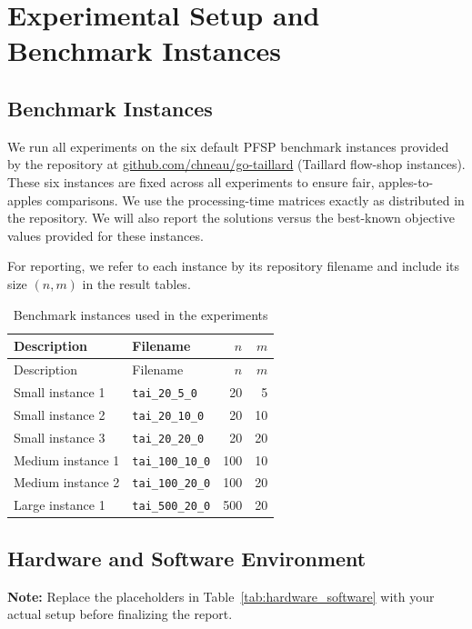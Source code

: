 \documentclass[12pt,a4paper]{report}
\begin{document}
\chapter{Experimental Setup and Benchmark Instances}
\section{Benchmark Instances}
We run all experiments on the six default PFSP benchmark instances provided by the repository at
\href{https://github.com/chneau/go-taillard}{github.com/chneau/go-taillard} (Taillard flow-shop instances).
These six instances are fixed across all experiments to ensure fair, apples-to-apples comparisons.
We use the processing-time matrices exactly as distributed in the repository. We will also report the solutions versus the best-known objective values provided for these instances.

For reporting, we refer to each instance by its repository filename and include its size $(n,m)$ in the result tables.\\

\begin{longtable}{llrr}
\caption{Benchmark instances used in the experiments}\label{tab:bench_instances}\\
\toprule
Description & Filename & $n$ & $m$ \\
\midrule
\endfirsthead
\toprule
Description & Filename & $n$ & $m$ \\
\midrule
\endhead
Small instance 1 & \texttt{tai\_20\_5\_0} & 20 & 5 \\
Small instance 2 & \texttt{tai\_20\_10\_0} & 20 & 10 \\
Small instance 3 & \texttt{tai\_20\_20\_0} & 20 & 20 \\
Medium instance 1 & \texttt{tai\_100\_10\_0} & 100 & 10 \\
Medium instance 2 & \texttt{tai\_100\_20\_0} & 100 & 20 \\
Large instance 1 & \texttt{tai\_500\_20\_0} & 500 & 20 \\
\bottomrule
\end{longtable}

\section{Hardware and Software Environment}\noindent\textbf{Note:} Replace the placeholders in Table~\ref{tab:hardware_software} with your actual setup before finalizing the report.
\end{document}
